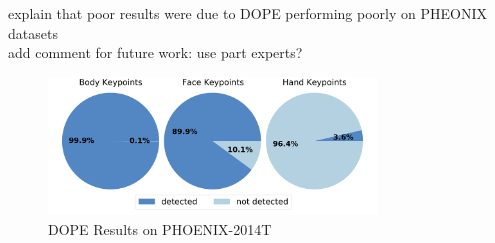 \documentclass[final]{cvpr}
\begin{document}
explain that poor results were due to DOPE performing poorly on PHEONIX datasets\\
add comment for future work: use part experts?

\begin{figure}[h]
	\centering
	\includegraphics[width=8.7cm]{fig/keypoints.pdf}
	\caption{DOPE Results on  PHOENIX-2014T}
	\label{fig:pie_charts}
\end{figure} 

{\small


}
\end{document}

